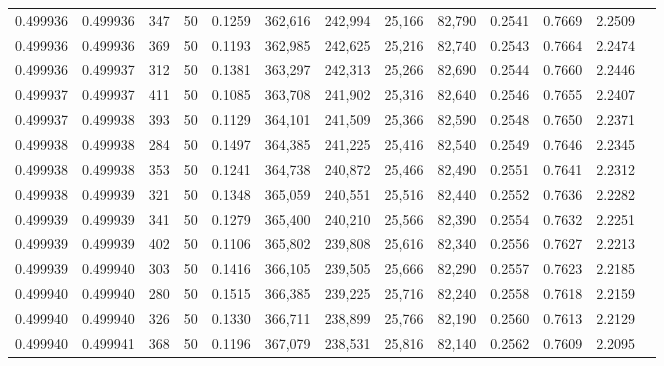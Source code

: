 \begin{tabular}{rrrrrrrrrrrrr}
0.499936 & 0.499936 &   347 &  50 &                                     0.1259 & 362,616 & 242,994 &  25,166 &  82,790 & 0.2541 & 0.7669 & 2.2509 \\
0.499936 & 0.499936 &   369 &  50 &                                     0.1193 & 362,985 & 242,625 &  25,216 &  82,740 & 0.2543 & 0.7664 & 2.2474 \\
0.499936 & 0.499937 &   312 &  50 &                                     0.1381 & 363,297 & 242,313 &  25,266 &  82,690 & 0.2544 & 0.7660 & 2.2446 \\
0.499937 & 0.499937 &   411 &  50 &                                     0.1085 & 363,708 & 241,902 &  25,316 &  82,640 & 0.2546 & 0.7655 & 2.2407 \\
0.499937 & 0.499938 &   393 &  50 &                                     0.1129 & 364,101 & 241,509 &  25,366 &  82,590 & 0.2548 & 0.7650 & 2.2371 \\
0.499938 & 0.499938 &   284 &  50 &                                     0.1497 & 364,385 & 241,225 &  25,416 &  82,540 & 0.2549 & 0.7646 & 2.2345 \\
0.499938 & 0.499938 &   353 &  50 &                                     0.1241 & 364,738 & 240,872 &  25,466 &  82,490 & 0.2551 & 0.7641 & 2.2312 \\
0.499938 & 0.499939 &   321 &  50 &                                     0.1348 & 365,059 & 240,551 &  25,516 &  82,440 & 0.2552 & 0.7636 & 2.2282 \\
0.499939 & 0.499939 &   341 &  50 &                                     0.1279 & 365,400 & 240,210 &  25,566 &  82,390 & 0.2554 & 0.7632 & 2.2251 \\
0.499939 & 0.499939 &   402 &  50 &                                     0.1106 & 365,802 & 239,808 &  25,616 &  82,340 & 0.2556 & 0.7627 & 2.2213 \\
0.499939 & 0.499940 &   303 &  50 &                                     0.1416 & 366,105 & 239,505 &  25,666 &  82,290 & 0.2557 & 0.7623 & 2.2185 \\
0.499940 & 0.499940 &   280 &  50 &                                     0.1515 & 366,385 & 239,225 &  25,716 &  82,240 & 0.2558 & 0.7618 & 2.2159 \\
0.499940 & 0.499940 &   326 &  50 &                                     0.1330 & 366,711 & 238,899 &  25,766 &  82,190 & 0.2560 & 0.7613 & 2.2129 \\
0.499940 & 0.499941 &   368 &  50 &                                     0.1196 & 367,079 & 238,531 &  25,816 &  82,140 & 0.2562 & 0.7609 & 2.2095 \\

\end{tabular}
